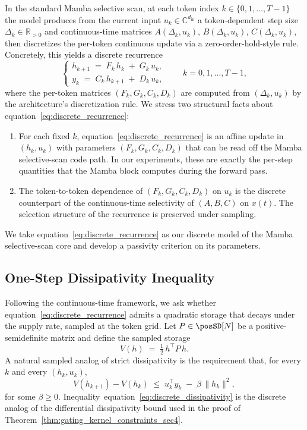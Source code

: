 \documentclass[10pt]{article} %
\def\eqref#1{equation~\ref{#1}}
\theoremstyle{definition}
\begin{document}
In the standard Mamba selective scan, at each token index $k\in\{0,1,\ldots,T-1\}$ the model produces from the current input $u_k\in\mathbb{C}^{d_{\mathrm{in}}}$ a token-dependent step size $\Delta_k\in\mathbb{R}_{>0}$ and continuous-time matrices $A(\Delta_k,u_k)$, $B(\Delta_k,u_k)$, $C(\Delta_k,u_k)$, then discretizes the per-token continuous update via a zero-order-hold-style rule. Concretely, this yields a discrete recurrence
\begin{equation}
\label{eq:discrete_recurrence}
\begin{cases}
h_{k+1} \;=\; F_k\, h_k \;+\; G_k\, u_k,\\
y_k \;=\; C_k\, h_{k+1} \;+\; D_k\, u_k,
\end{cases}
\qquad k=0,1,\ldots,T-1,
\end{equation}
where the per-token matrices $(F_k,G_k,C_k,D_k)$ are computed from $(\Delta_k,u_k)$ by the architecture's discretization rule. We stress two structural facts about \eqref{eq:discrete_recurrence}:
\begin{enumerate}[label=(\roman*)]
    \item For each fixed $k$, \eqref{eq:discrete_recurrence} is an affine update in $(h_k,u_k)$ with parameters $(F_k,G_k,C_k,D_k)$ that can be read off the Mamba selective-scan code path. In our experiments, these are exactly the per-step quantities that the Mamba block computes during the forward pass.
    \item The token-to-token dependence of $(F_k,G_k,C_k,D_k)$ on $u_k$ is the discrete counterpart of the continuous-time selectivity of $(A,B,C)$ on $x(t)$. The selection structure of the recurrence is preserved under sampling.
\end{enumerate}
We take \eqref{eq:discrete_recurrence} as our discrete model of the Mamba selective-scan core and develop a passivity criterion on its parameters.

\subsection{One-Step Dissipativity Inequality}
\label{subsec:one_step_dissipativity}

Following the continuous-time framework, we ask whether \eqref{eq:discrete_recurrence} admits a quadratic storage that decays under the supply rate, sampled at the token grid. Let $P\in\posSD[N]$ be a positive-semidefinite matrix and define the sampled storage
\begin{equation*}
V(h)\;=\;\tfrac{1}{2}\, h^{\top} P\, h.
\end{equation*}
A natural sampled analog of strict dissipativity is the requirement that, for every $k$ and every $(h_k,u_k)$,
\begin{equation}
\label{eq:discrete_dissipativity}
V(h_{k+1}) - V(h_k) \;\le\; u_k^{\top} y_k \;-\; \beta\, \|h_k\|^2,
\end{equation}
for some $\beta\ge 0$. Inequality~\eqref{eq:discrete_dissipativity} is the discrete analog of the differential dissipativity bound used in the proof of Theorem~\ref{thm:gating_kernel_constraints_sec4}.
\end{document}

